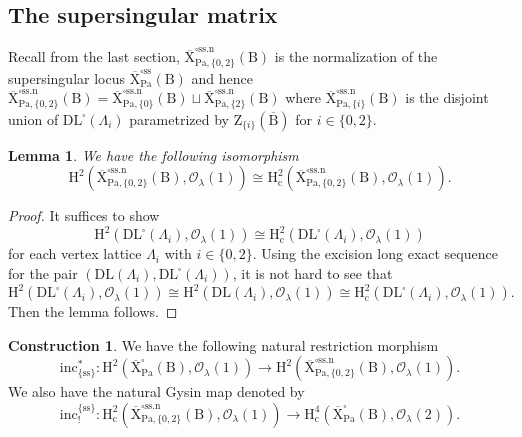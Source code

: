 \documentclass[10pt]{amsart}
\numberwithin{equation}{section}
\newtheorem{lemma}[equation]{Lemma}
\theoremstyle{definition}
\newtheorem{construction}[equation]{Construction}
\def\Pa{\mathrm{Pa}}
\def\calO{\mathcal{O}}
\def\rmc{\mathrm{c}}
\def\rmB{\mathrm{B}}
\def\rmH{\mathrm{H}}
\def\rmX{\mathrm{X}}
\def\rmZ{\mathrm{Z}}
\begin{document}
\subsection{The supersingular matrix} Recall from the last section, $\overline{\rmX}^{\square\mathrm{ss.n}}_{\Pa, \{0,2\}}(\rmB)$ is the normalization of the supersingular locus $\overline{\rmX}^{\square\mathrm{ss}}_{\Pa}(\rmB)$ and hence $\overline{\rmX}^{\square\mathrm{ss.n}}_{\Pa, \{0,2\}}(\rmB)=\overline{\rmX}^{\square\mathrm{ss.n}}_{\Pa, \{0\}}(\rmB)\sqcup \overline{\rmX}^{\square\mathrm{ss.n}}_{\Pa, \{2\}}(\rmB)$ where $\overline{\rmX}^{\square\mathrm{ss.n}}_{\Pa, \{i\}}(\rmB)$ is the disjoint union of $\mathrm{DL}^{\square}(\Lambda_{i})$ parametrized by $\rmZ_{\{i\}}(\overline{\rmB})$ for $i\in\{0,2\}$. 
\begin{lemma}
We have the following isomorphism
\begin{equation*}
\rmH^{2}(\overline{\rmX}^{\square\mathrm{ss.n}}_{\Pa,\{0,2\}}(\rmB), \calO_{\lambda}(1))\cong\rmH^{2}_{\rmc}(\overline{\rmX}^{\square\mathrm{ss.n}}_{\Pa,\{0,2\}}(\rmB), \calO_{\lambda}(1)).
\end{equation*}
\end{lemma}
\begin{proof}
It suffices to show 
\begin{equation*}
\rmH^{2}(\mathrm{DL}^{\square}(\Lambda_{i}), \calO_{\lambda}(1))\cong\rmH^{2}_{\rmc}(\mathrm{DL}^{\square}(\Lambda_{i}), \calO_{\lambda}(1))
\end{equation*}
for each vertex lattice $\Lambda_{i}$ with $i\in\{0,2\}$.
Using the excision long exact sequence for the pair $(\mathrm{DL}(\Lambda_{i}), \mathrm{DL}^{\square}(\Lambda_{i}))$, it is not hard to see that
\begin{equation*}
\rmH^{2}(\mathrm{DL}^{\square}(\Lambda_{i}), \calO_{\lambda}(1))\cong \rmH^{2}(\mathrm{DL}(\Lambda_{i}), \calO_{\lambda}(1))\cong \rmH^{2}_{\rmc}(\mathrm{DL}^{\square}(\Lambda_{i}), \calO_{\lambda}(1)).
\end{equation*}
Then the lemma follows.
\end{proof}

\begin{construction}
We have the following natural restriction morphism
\begin{equation*}
\mathrm{inc}^{\ast}_{\{\mathrm{ss}\}}: \rmH^{2}(\overline{\rmX}^{\square}_{\Pa}(\rmB), \calO_{\lambda}(1))\rightarrow \rmH^{2}(\overline{\rmX}^{\square\mathrm{ss.n}}_{\Pa,\{0,2\}}(\rmB), \calO_{\lambda}(1)).
\end{equation*}
We also have the natural Gysin map denoted by
\begin{equation*}
\mathrm{inc}^{\{\mathrm{ss}\}}_{!}: \rmH^{2}_{\rmc}(\overline{\rmX}^{\square\mathrm{ss.n}}_{\Pa,\{0,2\}}(\rmB), \calO_{\lambda}(1))\rightarrow \rmH^{4}_{\rmc}(\overline{\rmX}^{\square}_{\Pa}(\rmB), \calO_{\lambda}(2)).
\end{equation*}
\end{construction}
\end{document}
